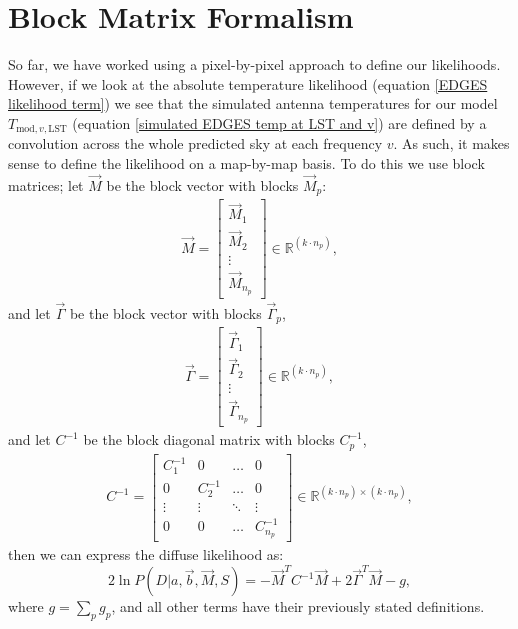 \documentclass[fleqn,usenatbib]{mnras}
\begin{document}
\section{Block Matrix Formalism}
So far, we have worked using a pixel-by-pixel approach to define our likelihoods. However, if we look at the absolute temperature likelihood (equation \ref{EDGES likelihood term}) we see that the simulated antenna temperatures for our model $T_{\mathrm{mod},v,\mathrm{LST}}$ (equation \ref{simulated EDGES temp at LST and v}) are defined by a convolution across the whole predicted sky at each frequency $v$. As such, it makes sense to define the likelihood on a map-by-map basis. To do this we use block matrices; let $\Vec{M}$ be the block vector with blocks $\Vec{M}_p$:
\begin{align}
    \Vec{M} = \begin{bmatrix} \Vec{M}_1 \\ \Vec{M}_2 \\ \vdots \\ \Vec{M}_{n_p} \end{bmatrix} \in \mathbb{R}^{(k\cdot n_p)},
\end{align}
and let $\Vec{\Gamma}$ be the block vector with blocks $\Vec{\Gamma}_p$,
\begin{align}
    \Vec{\Gamma} = \begin{bmatrix} \Vec{\Gamma}_1 \\ \Vec{\Gamma}_2 \\ \vdots \\ \Vec{\Gamma}_{n_p} \end{bmatrix} \in \mathbb{R}^{(k\cdot n_p)},
\end{align}
and let $C^{-1}$ be the block diagonal matrix with blocks $C_p^{-1}$,
\begin{align}
    C^{-1} = \begin{bmatrix} C_1^{-1} & 0 & \ldots & 0 \\ 0 & C_2^{-1} &\ldots &0 \\ \vdots &\vdots &\ddots &\vdots\\ 0 &0 &\ldots &C_{n_p}^{-1}\end{bmatrix} \in \mathbb{R}^{(k\cdot n_p)\times (k\cdot n_p)},
\end{align}
then we can express the diffuse likelihood as:
\begin{equation}\label{diffuse likelihood as a matrix equation}
    2\ln P(D|a,\Vec{b},\Vec{M},S) = -\Vec{M}^T C^{-1} \Vec{M} +2\Vec{\Gamma}^T\Vec{M} -g,
\end{equation}
where $g = \sum_p g_p$, and all other terms have their previously stated definitions.
\end{document}
